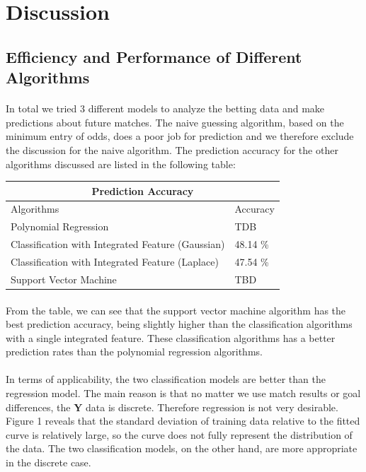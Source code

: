 \documentclass[12pt]{article}
\begin{document}
\section{Discussion}
\subsection{Efficiency and Performance of Different Algorithms}

\paragraph{}
In total we tried 3 different models to analyze the betting data and make predictions about future matches. The naive guessing algorithm, based on the minimum entry of odds, does a poor job for prediction and we therefore exclude the discussion for the naive algorithm. The prediction accuracy for the other algorithms discussed are listed in the following table:
\newline
\begin{tabular}{ |p{9cm}|p{2cm}|  }
	\hline
	\multicolumn{2}{|c|}{Prediction Accuracy} \\
	\hline
	Algorithms & Accuracy \\
	\hline
	Polynomial Regression & TDB \\ 
	Classification with Integrated Feature (Gaussian) & 48.14 \% \\
	Classification with Integrated Feature (Laplace) & 47.54 \% \\
	Support Vector Machine & TBD \\
	\hline
\end{tabular}
\paragraph{}
From the table, we can see that the support vector machine algorithm has the best prediction accuracy, being slightly higher than the classification algorithms with a single integrated feature. These classification algorithms has a better prediction rates than the polynomial regression algorithms.

\paragraph{}
In terms of applicability, the two classification models are better than the regression model. The main reason is that no matter we use match results or goal differences, the $\mathbf{Y}$ data is discrete. Therefore regression is not very desirable. Figure 1 reveals that the standard deviation of training data relative to the fitted curve is relatively large, so the curve does not fully represent the distribution of the data. The two classification models, on the other hand, are more appropriate in the discrete case.
\end{document}
